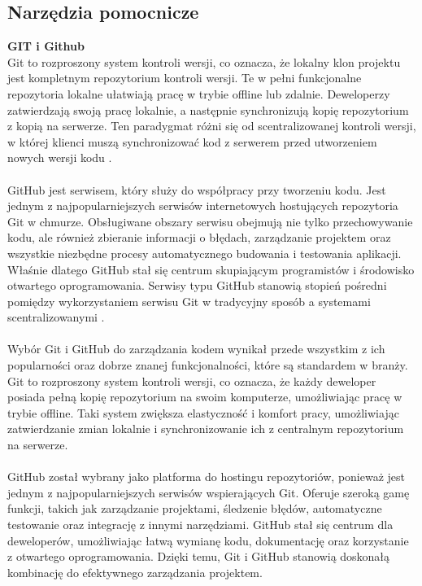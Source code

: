 \documentclass[twoside]{projektInzynierskiMS1}
\begin{document}
\newpage

\subsection{Narzędzia pomocnicze}

\noindent \textbf{GIT i Github}\\
Git to rozproszony system kontroli wersji, co oznacza, że lokalny klon projektu jest kompletnym repozytorium kontroli wersji. Te w pełni funkcjonalne repozytoria lokalne ułatwiają pracę w trybie offline lub zdalnie. Deweloperzy zatwierdzają swoją pracę lokalnie, a następnie synchronizują kopię repozytorium z kopią na serwerze. Ten paradygmat różni się od scentralizowanej kontroli wersji, w której klienci muszą synchronizować kod z serwerem przed utworzeniem nowych wersji kodu \cite{GitWhatIs}.
\\\\
GitHub jest serwisem, który służy do współpracy przy tworzeniu kodu. Jest jednym z najpopularniejszych serwisów internetowych hostujących repozytoria Git w chmurze. Obsługiwane obszary serwisu obejmują nie tylko przechowywanie kodu, ale również zbieranie informacji o błędach, zarządzanie projektem oraz wszystkie niezbędne procesy automatycznego budowania i testowania aplikacji. Właśnie dlatego GitHub stał się centrum skupiającym programistów i środowisko otwartego oprogramowania. Serwisy typu GitHub stanowią stopień pośredni pomiędzy wykorzystaniem serwisu Git w tradycyjny sposób a systemami scentralizowanymi \cite{CodersLabGitHub}.
\\\\
Wybór Git i GitHub do zarządzania kodem wynikał przede wszystkim z ich popularności oraz dobrze znanej funkcjonalności, które są standardem w branży. Git to rozproszony system kontroli wersji, co oznacza, że każdy deweloper posiada pełną kopię repozytorium na swoim komputerze, umożliwiając pracę w trybie offline. Taki system zwiększa elastyczność i komfort pracy, umożliwiając zatwierdzanie zmian lokalnie i synchronizowanie ich z centralnym repozytorium na serwerze.
\\\\
GitHub został wybrany jako platforma do hostingu repozytoriów, ponieważ jest jednym z najpopularniejszych serwisów wspierających Git. Oferuje szeroką gamę funkcji, takich jak zarządzanie projektami, śledzenie błędów, automatyczne testowanie oraz integrację z innymi narzędziami. GitHub stał się centrum dla deweloperów, umożliwiając łatwą wymianę kodu, dokumentację oraz korzystanie z otwartego oprogramowania. Dzięki temu, Git i GitHub stanowią doskonałą kombinację do efektywnego zarządzania projektem.
\end{document}
